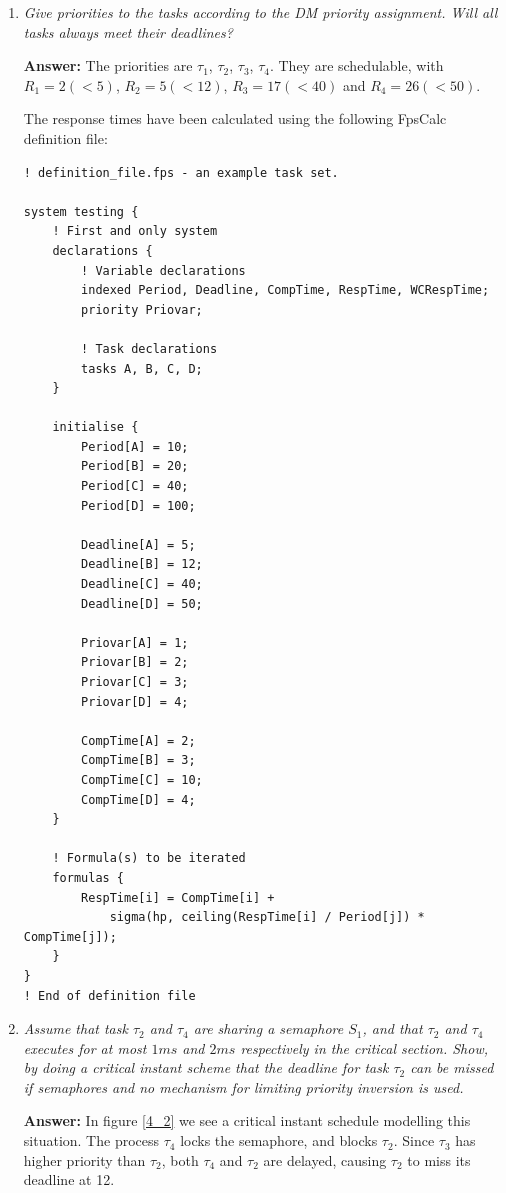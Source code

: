 \documentclass[a4paper,10pt]{article}
\newcommand{\answer}{\textbf{Answer: }}
\begin{document}
\begin{enumerate}
	\item \emph{Give priorities to the tasks according to the DM priority assignment. Will all tasks always meet their deadlines?}
	
	\answer The priorities are $\tau_1$, $\tau_2$, $\tau_3$, $\tau_4$. They are schedulable, with $R_1 = 2 (<5)$, $R_2 = 5 (<12)$, $R_3 = 17 (< 40)$ and $R_4 = 26 (<50)$.

        The response times have been calculated using the following FpsCalc definition file:

        \begin{lstlisting}
! definition_file.fps - an example task set.

system testing {
    ! First and only system
    declarations {		
        ! Variable declarations
        indexed Period, Deadline, CompTime, RespTime, WCRespTime;
        priority Priovar;	
        
        ! Task declarations
        tasks A, B, C, D;
    }

    initialise {
        Period[A] = 10;
        Period[B] = 20;
        Period[C] = 40;
        Period[D] = 100;
        
        Deadline[A] = 5;
        Deadline[B] = 12;
        Deadline[C] = 40;
        Deadline[D] = 50;
        
        Priovar[A] = 1;
        Priovar[B] = 2;
        Priovar[C] = 3;
        Priovar[D] = 4;
        
        CompTime[A] = 2;
        CompTime[B] = 3;
        CompTime[C] = 10;
        CompTime[D] = 4;
    }

    ! Formula(s) to be iterated
    formulas {
        RespTime[i] = CompTime[i] +
            sigma(hp, ceiling(RespTime[i] / Period[j]) * CompTime[j]);
    }
}				   
! End of definition file
        \end{lstlisting}

	\item \emph{Assume that task $\tau_2$ and $\tau_4$ are sharing a semaphore $S_1$, and that $\tau_2$ and $\tau_4$ executes for at most $1 ms$ and $2 ms$ respectively in the critical section. Show, by doing a critical instant scheme that the deadline for task $\tau_2$ can be missed if semaphores and no mechanism for limiting priority inversion is used.}
	
	\answer In figure \ref{4_2} we see a critical instant schedule modelling this situation. The process $\tau_4$ locks the semaphore, and blocks $\tau_2$. Since $\tau_3$ has higher priority than $\tau_2$, both $\tau_4$ and $\tau_2$ are delayed, causing $\tau_2$ to miss its deadline at 12.


\end{enumerate}
\end{document}
